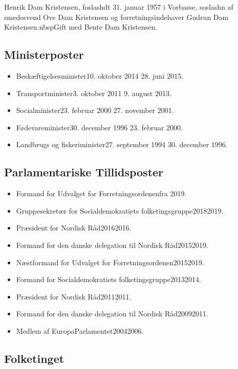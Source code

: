 \documentclass[11pt, a4paper]{awesome-cv}
\begin{document}
\makecvheader[R]
\makelettertitle
\begin{cvletter}
Henrik Dam Kristensen, foslashdt 31. januar 1957 i Vorbasse, soslashn af smedesvend Ove Dam Kristensen og forretningsindehaver Gudrun Dam Kristensen.nbspGift med Bente Dam Kristensen.

\subsection*{Ministerposter}
\begin{itemize}
\item Beskæftigelsesminister10. oktober 2014  28. juni 2015.
\item Transportminister3. oktober 2011  9. august 2013.
\item Socialminister23. februar 2000  27. november 2001.
\item Fødevareminister30. december 1996  23. februar 2000.
\item Landbrugs og fiskeriminister27. september 1994  30. december 1996.
\end{itemize}
\subsection*{Parlamentariske Tillidsposter}
\begin{itemize}
\item Formand for Udvalget for Forretningsordenenfra 2019.
\item Gruppesekretær for Socialdemokratiets folketingsgruppe20182019.
\item Præsident for Nordisk Råd20162016.
\item Formand for den danske delegation til Nordisk Råd20152019.
\item Næstformand for Udvalget for Forretningsordenen20152019.
\item Formand for Socialdemokratiets folketingsgruppe20132014.
\item Præsident for Nordisk Råd20112011.
\item Formand for den danske delegation til Nordisk Råd20092011.
\item Medlem af EuropaParlamentet20042006.
\end{itemize}
\subsection*{Folketinget}

\end{cvletter}
\end{document}
